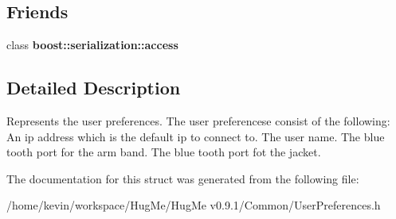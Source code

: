 \subsection*{Friends}
\begin{DoxyCompactItemize}
\item 
\hypertarget{structUserPreferences_ac98d07dd8f7b70e16ccb9a01abf56b9c}{
class {\bfseries boost::serialization::access}}
\label{structUserPreferences_ac98d07dd8f7b70e16ccb9a01abf56b9c}

\end{DoxyCompactItemize}


\subsection{Detailed Description}
Represents the user preferences. The user preferencese consist of the following: An ip address which is the default ip to connect to. The user name. The blue tooth port for the arm band. The blue tooth port fot the jacket. 

The documentation for this struct was generated from the following file:\begin{DoxyCompactItemize}
\item 
/home/kevin/workspace/HugMe/HugMe v0.9.1/Common/UserPreferences.h\end{DoxyCompactItemize}
